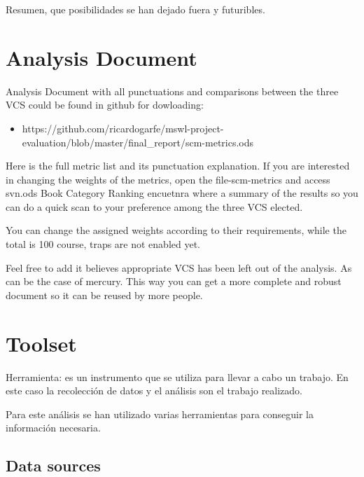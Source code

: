 \documentclass[11pt]{scrartcl}
\begin{document}
Resumen, que posibilidades se han dejado fuera y futuribles.

\section{Analysis Document}

Analysis Document with all punctuations and comparisons between the three VCS could be found in github for dowloading:
\begin{itemize}
    \item https://github.com/ricardogarfe/mswl-project-evaluation/blob/master/final\_report/scm-metrics.ods
\end{itemize}

Here is the full metric list and its punctuation explanation. If you are interested in changing the weights of the metrics, open the file-scm-metrics and access svn.ods Book Category Ranking encuetnra where a summary of the results so you can do a quick scan to your preference among the three VCS elected.

\par You can change the assigned weights according to their requirements, while the total is 100 course, traps are not enabled yet.

\par Feel free to add it believes appropriate VCS has been left out of the analysis. As can be the case of mercury. This way you can get a more complete and robust document so it can be reused by more people.

\section{Toolset}

\par Herramienta: es un instrumento que se utiliza para llevar a cabo un trabajo. En este caso la recolección de datos y el análisis son el trabajo realizado.

\par Para este análisis se han utilizado varias herramientas para conseguir la información necesaria.

\subsection{Data sources}
\end{document}
